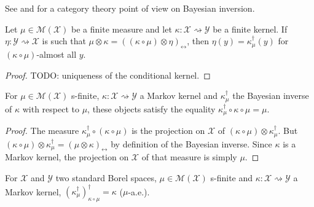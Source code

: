 See \cite{clerc2017pointless} and \cite{dahlqvist2018borel} for a category theory point of view on Bayesian inversion.

\begin{lemma}
  \label{lem:eq_bayesInv_of_compProd_eq}
  \mathlibok
  Let $\mu \in \mathcal M(\mathcal X)$ be a finite measure and let $\kappa : \mathcal X \rightsquigarrow \mathcal Y$ be a finite kernel.
  If $\eta : \mathcal Y \rightsquigarrow \mathcal X$ is such that $\mu \otimes \kappa = ((\kappa \circ \mu) \otimes \eta)_\leftrightarrow$, then $\eta(y) = \kappa_\mu^\dagger(y)$ for $(\kappa \circ \mu)$-almost all $y$.
\end{lemma}

\begin{proof}\mathlibok
\uses{}
TODO: uniqueness of the conditional kernel.
\end{proof}


\begin{lemma}
  \label{lem:bayesInv_comp_self}
  \mathlibok
  For $\mu \in \mathcal M(\mathcal X)$ s-finite, $\kappa : \mathcal X \rightsquigarrow \mathcal Y$ a Markov kernel and $\kappa_\mu^\dagger$ the Bayesian inverse of $\kappa$ with respect to $\mu$, these objects satisfy the equality $\kappa_\mu^\dagger \circ \kappa \circ \mu = \mu$.
\end{lemma}

\begin{proof}\mathlibok
\uses{}
The measure $\kappa_\mu^\dagger \circ (\kappa \circ \mu)$ is the projection on $\mathcal X$ of $(\kappa \circ \mu) \otimes \kappa_\mu^\dagger$. But $(\kappa \circ \mu) \otimes \kappa_\mu^\dagger = (\mu \otimes \kappa)_\leftrightarrow$ by definition of the Bayesian inverse. Since $\kappa$ is a Markov kernel, the projection on $\mathcal X$ of that measure is simply $\mu$.
\end{proof}


\begin{lemma}
  \label{lem:bayesInv_self}
  \mathlibok
  For $\mathcal X$ and $\mathcal Y$ two standard Borel spaces, $\mu \in \mathcal M(\mathcal X)$ s-finite and $\kappa : \mathcal X \rightsquigarrow \mathcal Y$ a Markov kernel, $(\kappa_\mu^\dagger)_{\kappa \circ \mu}^\dagger = \kappa$ ($\mu$-a.e.).
\end{lemma}

